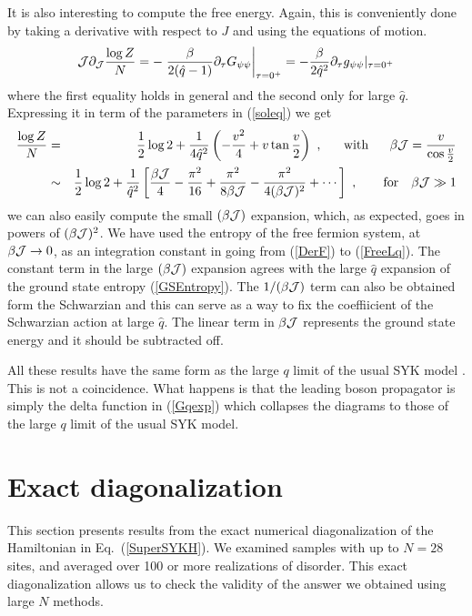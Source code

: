 \documentclass[aps,pre,preprint,onecolumn,citeautoscript,superscriptaddress,nofootinbib,eqsecnum]{revtex4-1}
\def\bea{\begin{eqnarray}}
\def\eea{\end{eqnarray}}
\def\nref#1{(\ref{#1})}
\def\be{\begin{equation}}
\def\ee{\end{equation}}
\def\la{\label}
\begin{document}
  It is also interesting to compute the free energy. Again, this is conveniently done by taking a derivative with respect to $J$ and using the equations of motion. 
  \be \la{DerF}
  {  \cal  J } \partial_{ \cal  J } { \log Z \over N } = - \left. { \beta \over 2 ( \hat q -1)} \partial_\tau G_{\psi \psi} \right|_{\tau = 0^+}=
   - { \beta \over 2 \hat q^2 } \partial_\tau g_{\psi \psi }   |_{\tau = 0^+}
   \ee
   where the first equality holds in general and the second only for large $\hat q$. Expressing it in term of the parameters in \nref{soleq} we get
   \bea \la{FreeLq}
   { \log Z \over N } &= & { 1 \over 2 } \log 2 + { 1 \over 4 \hat q^2 } \left( - { v^2 \over 4 } + v \tan{ v \over 2 } \right) ~,~~~~~{\rm with}~~~~~{ \beta \cal J } = { v \over \cos { v \over 2 } }
   \cr
   &\sim & { 1 \over 2 } \log 2 + { 1 \over   \hat q^2 } \left[ { \beta {\cal J } \over 4 } - { \pi^2 \over 16 } + { \pi^2 \over 8 \beta {\cal J } }  - { \pi^2 \over 4 (\beta {\cal J})^2 } + \cdots \right] ~,~~~~~~{\rm for}
   ~~~ {\beta {\cal J } } \gg 1 
 \eea
 we can also easily compute the small $(\beta {\cal J})$ expansion, which, as expected, goes in powers of $(\beta {\cal J })^2 $. 
  We have used the entropy of the free fermion system,  at $\beta {\cal J } \to 0$, as an integration constant in going from \nref{DerF} to \nref{FreeLq}. 
  The constant term in the large $(\beta {\cal J })$ expansion agrees with the large $\hat q$ expansion of the ground state entropy \nref{GSEntropy}. 
  The $1/(\beta {\cal J } )$ term can also be obtained form the Schwarzian and this can serve as a way to fix the coeffiicient of the Schwarzian action at large $\hat q$. 
  The linear term in ${\beta {\cal J } }$ represents the ground state energy and it should be subtracted off. 
  
  All these results have the same form as the large $q$ limit of the usual SYK model \cite{JMDS16}. This is not a coincidence. What happens is that the leading boson 
  propagator is simply the delta function in \nref{Gqexp} which collapses the diagrams to those of the large $q$ limit of the usual SYK model. 
  
   


\section{Exact diagonalization}

This section presents results from the exact numerical diagonalization of the Hamiltonian in Eq.~(\ref{SuperSYKH}).
We examined samples with up to $N=28$ sites, and averaged over 100 or more realizations of disorder.
This exact diagonalization allows us to check the validity of the answer we obtained using large $N$ methods.
 
\end{document}
